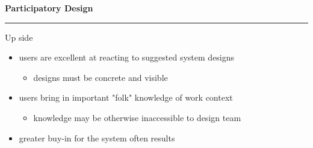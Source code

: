 \documentclass[pdf]{beamer}
\begin{document}
\begin{frame}
\vspace{8mm}
\textcolor{myBlue}{\textbf{\Large{Participatory Design}}}

\textcolor{red}{\rule{10cm}{1mm}}

\bigskip

{\LARGE Up side \LARGE}

\begin{itemize}
\item users are excellent at reacting to suggested system designs
\begin{itemize}
\item designs must be concrete and visible
\newline
\end{itemize}

\item users bring in important "folk" knowledge of work context
\begin{itemize}
\item knowledge may be otherwise inaccessible to design team
\newline
\end{itemize}

\item
greater buy-in for the system often results
\end{itemize}

\bigskip
\bigskip
\bigskip

\end{frame}
\end{document}
